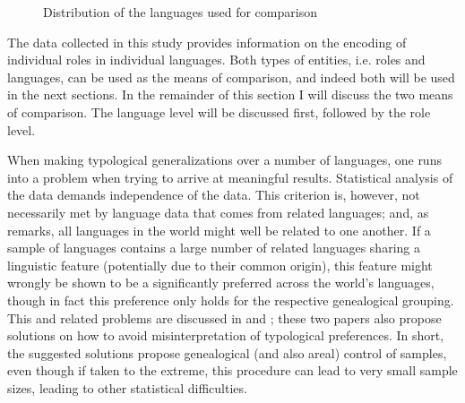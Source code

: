 \begin{figure}[htbp] \centering {}%
\caption{Distribution of the languages used for comparison}\label{MapReduxBW}
\end{figure}


The data collected in this study provides information on the encoding of individual roles in individual languages. 
Both types of entities, i.e. roles and languages, can be used as the means of comparison, and indeed both will be used in the next sections.
In the remainder of this section I will discuss the two means of comparison. 
The language level will be discussed first, followed by the role level. 

When making typological generalizations over a number of languages, one runs into a problem when trying to arrive at meaningful results.
Statistical analysis of the data demands independence of the data. 
This criterion is, however, not necessarily met by language data that comes from related languages; and, as \citet{Dryer:1989} remarks, all languages in the world might well be related to one another.
If a sample of languages contains a large number of related languages sharing a linguistic feature (potentially due to their common origin), this feature might wrongly be shown to be a significantly preferred across the world's languages, though in fact this preference only holds for the respective genealogical grouping. 
This and related problems are discussed in \citet{Dryer:1989} and \citet{Bickel.samp}; these two papers also propose solutions on how to avoid misinterpretation of typological preferences.
In short, the suggested solutions propose genealogical (and also areal) control of samples, even though if taken to the extreme, this procedure can lead to very small sample sizes, leading to other statistical difficulties. 

